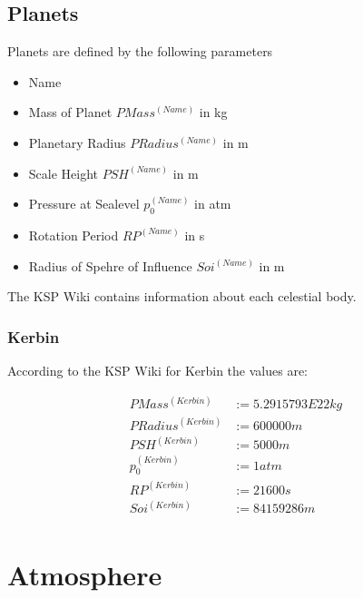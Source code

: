 \documentclass[11pt]{report}
\begin{document}
\section{Planets}

Planets are defined by the following parameters

\begin{itemize}
\item Name
\item {} Mass of Planet $PMass^{(Name)}$ in kg
\item {} Planetary Radius $PRadius^{(Name)}$ in m
\item {} Scale Height $PSH^{(Name)}$ in m
\item {} Pressure at Sealevel $p_0^{(Name)}$ in atm
\item {} Rotation Period $RP^{(Name)}$ in s
\item {} Radius of Spehre of Influence $Soi^{(Name)}$ in m
\end{itemize}

The KSP Wiki \cite{Wiki} contains information about each celestial body.

\subsection{Kerbin}

According to the KSP Wiki for Kerbin the values are:

\begin{align*}
  PMass^{(Kerbin)} &:= 5.2915793E22 kg\\
  PRadius^{(Kerbin)} &:= 600000 m\\
  PSH^{(Kerbin)} &:= 5000 m\\
  p_0^{(Kerbin)} &:= 1 atm\\
  RP^{(Kerbin)} &:= 21600 s\\
  Soi^{(Kerbin)} &:= 84159286 m\\
\end{align*}

\chapter{Atmosphere}
\end{document}
